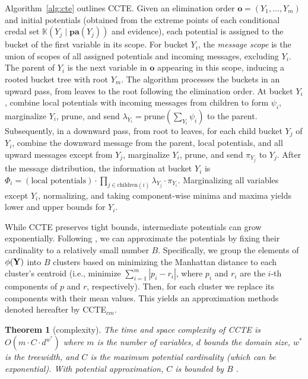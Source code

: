 \documentclass{article}
\newtheorem{theorem}{Theorem}
\newcommand{\kr}[1]{\mathbb{K}\!\left( #1 \right)}
\begin{document}
Algorithm~\ref{alg:cte} outlines CCTE. Given an elimination order $\mathbf{o}=(Y_1,\dots,Y_m)$ and initial potentials (obtained from the extreme points of each conditional credal set $\kr{Y_j\mid \mathbf{pa}(Y_j)}$ and evidence), each potential is assigned to the bucket of the first variable in its scope. For bucket $Y_i$, the \emph{message scope} is the union of scopes of all assigned potentials and incoming messages, excluding $Y_i$. The parent of $Y_i$ is the next variable in $\mathbf{o}$ appearing in this scope, inducing a rooted bucket tree with root $Y_m$. The algorithm processes the buckets in an upward pass, from leaves to the root following the elimination order. At bucket $Y_i$, combine local potentials with incoming messages from children to form $\psi_i$, marginalize $Y_i$, prune, and send $\lambda_{Y_i} = \mathrm{prune}(\sum_{Y_i} \psi_i)$ to the parent. Subsequently, in a downward pass, from root to leaves, for each child bucket $Y_j$ of $Y_i$, combine the downward message from the parent, local potentials, and all upward messages except from $Y_j$, marginalize $Y_i$, prune, and send $\pi_{Y_j}$ to $Y_j$. After the message distribution, the information at bucket $Y_i$ is $\Phi_i = (\text{local potentials}) \cdot \prod_{j\in\mathrm{children}(i)} \lambda_{Y_j} \cdot \pi_{Y_i}$. Marginalizing all variables except $Y_i$, normalizing, and taking component-wise minima and maxima yields lower and upper bounds for $Y_i$.

While CCTE preserves tight bounds, intermediate potentials can grow exponentially. Following \cite{maua2020ijar,marinescu2026iclr}, we can approximate the potentials by fixing their cardinality to a relatively small number $B$. Specifically, we group the elements of $\phi(\mathbf{Y})$ into $B$ clusters based on minimizing the Manhattan distance to each cluster's centroid (i.e., minimize $\sum_{i=1}^{m} |p_i - r_i|$, where $p_i$ and $r_i$ are the $i$-th components of $p$ and $r$, respectively). Then, for each cluster we replace its components with their mean values. This yields an approximation methods  denoted hereafter by CCTE$_{cm}$.

\begin{theorem}[complexity]
    The time and space complexity of CCTE is $O(m \cdot C \cdot d^{w^*})$ where $m$ is the number of variables, $d$ bounds the domain size, $w^*$ is the treewidth, and $C$ is the maximum potential cardinality (which can be exponential). With potential approximation, $C$ is bounded by $B$ \cite{marinescu2026iclr}.
\end{theorem}
\end{document}

